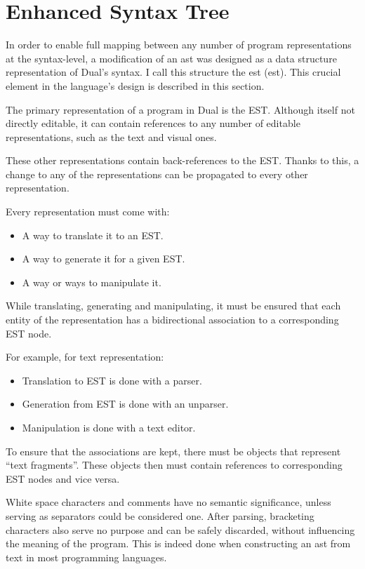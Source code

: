 \section{Enhanced Syntax Tree}\label{sec:est}
In order to enable full mapping between any number of program representations at the syntax-level, a modification of an \acrshort{ast} was designed as a data structure representation of Dual's syntax. I call this structure the \acrlong{est} (\acrshort{est}). This crucial element in the language's design is described in this section.

The primary representation of a program in Dual is the EST. Although itself not directly editable, it can contain references to any number of editable representations, such as the text and visual ones.

These other representations contain back-references to the EST. Thanks to this, a change to any of the representations can be propagated to every other representation.

Every representation must come with:
\begin{itemize}
    \item A way to translate it to an EST.
    \item A way to generate it for a given EST.
    \item A way or ways to manipulate it.
\end{itemize}

While translating, generating and manipulating, it must be ensured that each entity of the representation has a bidirectional association to a corresponding EST node.

For example, for text representation:
\begin{itemize}
    \item Translation to EST is done with a parser.
    \item Generation from EST is done with an unparser\cite{unparser_wikipedia}.
    \item Manipulation is done with a text editor.
\end{itemize}

To ensure that the associations are kept, there must be objects that represent ``text fragments''. These objects then must contain references to corresponding EST nodes and vice versa.

White space characters and comments have no semantic significance, unless serving as separators could be considered one. After parsing, bracketing characters also serve no purpose and can be safely discarded, without influencing the meaning of the program. This is indeed done when constructing an \acrshort{ast} from text in most programming languages.

